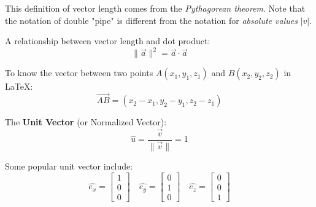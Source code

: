 This definition of vector length comes from the \textit{Pythagorean theorem}. Note that the notation of double "pipe" is different from the notation for \textit{absolute values} $|v|$.

A relationship between vector length and dot product: $$\|\vec{a}\| ^2=\vec{a}\cdot\vec{a}$$

To know the vector between two points $A(x_1,y_1,z_1)$ and $B(x_2,y_2,z_2)$ in \LaTeX: $$\overrightarrow{AB} = (x_2 - x_1, y_2 - y_1, z_2 - z_1)$$

The \textbf{Unit Vector} (or Normalized Vector):$$\widehat{u} = \frac{\vec{v}}{\|\vec{v}\|} = 1$$

Some popular unit vector include:$$
\widehat{e_x}=\begin{bmatrix}
1\\0\\0
\end{bmatrix}
\quad
\widehat{e_y}=\begin{bmatrix}
0\\1\\0
\end{bmatrix}
\quad
\widehat{e_z}=\begin{bmatrix}
0\\0\\1
\end{bmatrix}
$$